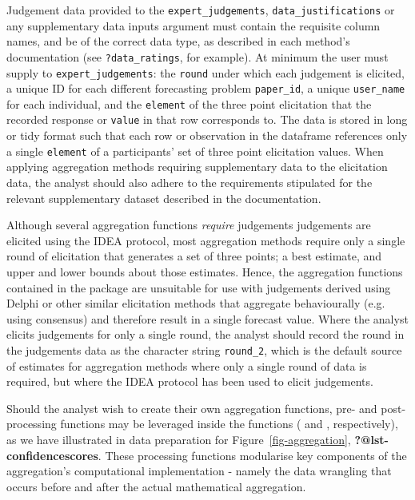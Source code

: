 \documentclass[article]{jss}
\newcommand{\fct}[1]{\code{#1()}}
\begin{document}
Judgement data provided to the \texttt{expert\_judgements},
\texttt{data\_justifications} or any supplementary data inputs argument
must contain the requisite column names, and be of the correct data
type, as described in each method's documentation (see
\texttt{?data\_ratings}, for example). At minimum the user must supply
to \texttt{expert\_judgements}: the \texttt{round} under which each
judgement is elicited, a unique ID for each different forecasting
problem \texttt{paper\_id}, a unique \texttt{user\_name} for each
individual, and the \texttt{element} of the three point elicitation that
the recorded response or \texttt{value} in that row corresponds to. The
data is stored in long or tidy format such that each row or observation
in the dataframe references only a single \texttt{element} of a
participants' set of three point elicitation values. When applying
aggregation methods requiring supplementary data to the elicitation
data, the analyst should also adhere to the requirements stipulated for
the relevant supplementary dataset described in the documentation.

Although several aggregation functions \emph{require} judgements
judgements are elicited using the IDEA protocol, most aggregation
methods require only a single round of elicitation that generates a set
of three points; a best estimate, and upper and lower bounds about those
estimates. Hence, the aggregation functions contained in the
 package are unsuitable for use with judgements derived
using Delphi or other similar elicitation methods that aggregate
behaviourally (e.g. using consensus) and therefore result in a single
forecast value. Where the analyst elicits judgements for only a single
round, the analyst should record the round in the judgements data as the
character string \texttt{round\_2}, which is the default source of
estimates for aggregation methods where only a single round of data is
required, but where the IDEA protocol has been used to elicit
judgements.

Should the analyst wish to create their own aggregation functions, pre-
and post-processing functions may be leveraged inside the functions
(\fct{preprocess\_judgements} and \fct{postprocess\_judgements},
respectively), as we have illustrated in data preparation for
Figure~\ref{fig-aggregation}, \textbf{?@lst-confidencescores}. These
processing functions modularise key components of the aggregation's
computational implementation - namely the data wrangling that occurs
before and after the actual mathematical aggregation.
\end{document}
